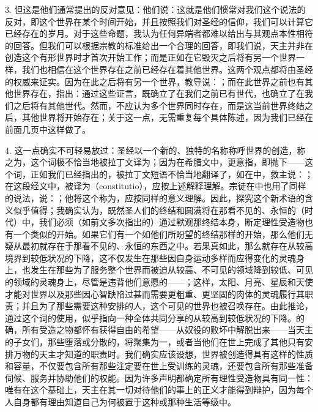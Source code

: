 3. 但这是他们通常提出的反对意见：他们说：这就是他们惯常对我们这个说法的反对，即这个世界在某个时间开始，并且按照我们对圣经的信仰，我们可以计算它已经存在的岁月。对于这些命题，我认为任何异端者都难以给出与其观点本性相符的回答。但我们可以根据宗教的标准给出一个合理的回答，即我们说，天主并非在创造这个有形世界时才首次开始工作；而是正如在它毁灭之后将有另一个世界一样，我们也相信在这个世界存在之前已经存在着其他世界。这两个观点都将由圣经的权威来证实。因为在此之后将有另一个世界，教导说：；而在此世界之前也有其他世界存在，指出：通过这些证言，既确立了在我们之前已有世代，也确立了在我们之后将有其他世代。然而，不应认为多个世界同时存在，而是这当前世界终结之后，其他世界将开始存在；关于这一点，无需重复每个具体陈述，因为我们已经在前面几页中这样做了。\par

4. 这一点确实不可轻易放过：圣经以一个新的、独特的名称称呼世界的创造，称之为，这个词极不恰当地被拉丁文译为；因为在希腊文中，更意指，即抛下——这个词，正如我们已经指出的，被拉丁文短语不恰当地翻译了，如在中，救主说：；在这段经文中，被译为（constitutio），应按上述解释理解。宗徒在中也用了同样的说法，说：；他将这个称为，应按同样的意义理解。因此，探究这个新术语的含义似乎值得；我确实认为，既然圣人们的终结和圆满将在那看不见的、永恒的（时代）中，我们必须（如前文多次指出的）通过默观那终结本身，断定理性受造物也有一个类似的开始。如果它们有一个如他们所盼望的终结那样的开始，那么他们无疑从最初就存在于那看不见的、永恒的东西之中。若果真如此，那么就存在从较高境界到较低状况的下降，这不仅发生在那些因自身运动多样而应得变化的灵魂身上，也发生在那些为了服务整个世界而被迫从较高、不可见的领域降到较低、可见的领域的灵魂身上，尽管是违背他们意愿的——；这样，太阳、月亮、星辰和天使才能对世界以及那些因心智缺陷过甚而需要更粗重、更坚固的肉体的灵魂履行其职责；并且为了那些需要这种安排的人，这个可见的世界也被召唤存在。由此推论，通过这个词的使用，似乎指向一种全体共同分享的从较高到较低状况的下降。的确，所有受造之物都怀有获得自由的希望——从奴役的败坏中解脱出来——当天主的子女们，那些堕落或分散的，将聚集为一，或者当他们在世上完成了其他只有安排万物的天主才知道的职责时。我们确实应该设想，世界被创造得具有这样的性质和容量，不仅要包含所有那些注定要在世上受训练的灵魂，还要包含所有那些准备伺候、服务并协助他们的权能。因为许多声明都确定所有理性受造物具有同一性：唯有在这个基础上，天主在其一切对待他们的事上的正义才能得到辩护，因为每个人自身都有理由知道自己为何被置于这种或那种生活等级中。\par


